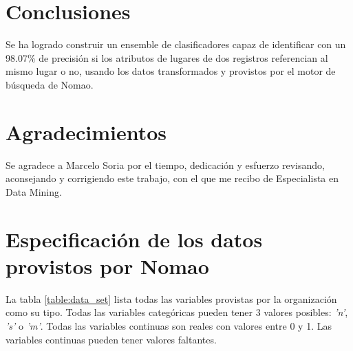 \documentclass[journal]{IEEEtran}
\begin{document}
\section{Conclusiones}
Se ha logrado construir un ensemble de clasificadores capaz de identificar
con un 98.07\% de precisión si los atributos de lugares de dos registros
referencian al mismo lugar o no,
usando los datos transformados y provistos por el motor de búsqueda de Nomao.

\section*{Agradecimientos}
Se agradece a Marcelo Soria por el tiempo, dedicación y esfuerzo 
revisando, aconsejando y corrigiendo este trabajo, 
con el que me recibo de Especialista
en Data Mining.


\appendices

\section{Especificación de los datos provistos por Nomao}
\label{appendix1}
La tabla \ref{table:data_set} lista todas las variables provistas por la
organización como su tipo. Todas las variables 
categóricas pueden tener 3 valores posibles:
\textit{'n'}, \textit{'s'} o \textit{'m'}.
Todas las variables continuas son reales con valores entre 
0 y 1. Las variables continuas pueden tener valores faltantes.
\end{document}
